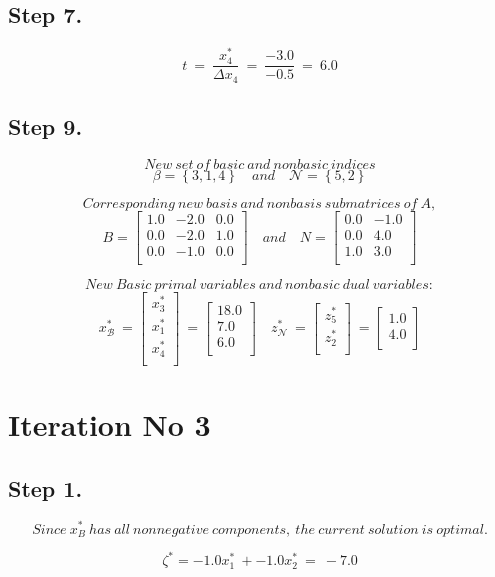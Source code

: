 \documentclass [12pt] {article}
\begin{document}
\subsection{Step 7.}
\[
t \ =\ \frac{x_{4}^{*}}{ \Delta x_{4}}\ =\ \frac{-3.0}{-0.5}\ =\ 6.0
\]
\subsection{Step 9.}

\[ New\ set\  of\  basic\  and\  nonbasic\  indices \]
\[
\beta= \left\{3, 1, 4\right\} \quad and \quad  \mathcal{N}=\left\{5, 2\right\}
\]

\[
Corresponding\ new\ basis\ and\ nonbasis\ submatrices\ of\ A,
\]
\[
B =
\begin{bmatrix}
1.0 & -2.0 & 0.0 \\ 0.0 & -2.0 & 1.0 \\ 0.0 & -1.0 & 0.0 \\ 
\end{bmatrix} \quad and \quad
\mathit{N} =
\begin{bmatrix}
0.0 & -1.0 \\ 0.0 & 4.0 \\ 1.0 & 3.0 \\ 
\end{bmatrix}
\]

\[
New\ Basic\ primal\ variables\ and\ nonbasic\ dual\ variables:
\]
\[
x_{\mathcal B}^{*}\ =\begin{bmatrix}
x_{3}^{*} \\x_{1}^{*} \\x_{4}^{*} \\
\end{bmatrix}\ =\begin{bmatrix}
18.0 \\ 7.0 \\ 6.0 \\ 
\end{bmatrix}\quad
z_{\mathcal N}^{*}\ =\begin{bmatrix}
z_{5}^{*} \\z_{2}^{*} \\
\end{bmatrix}\ =\begin{bmatrix}
1.0 \\ 4.0 \\ 
\end{bmatrix}
\]
\section*{Iteration No 3}
\subsection{Step 1.}
\[
Since\ x_\mathit{B}^*\ has\ all\ nonnegative\ components,\ the\ current\ solution\ is\ optimal.
\]

\[
\zeta^{*} = -1.0x_{1}^{*}\ +-1.0x_{2}^{*}\ =\ -7.0
\]
 
\end{document}
